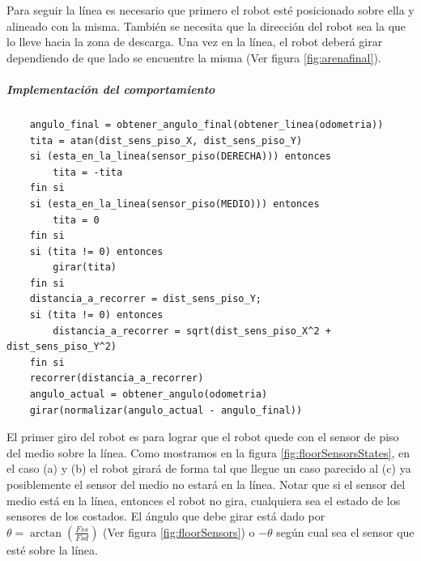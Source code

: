 Para seguir la l\'inea es necesario que primero el robot est\'e posicionado
sobre ella y alineado con la misma. Tambi\'en se necesita que la direcci\'on
del robot sea la que lo lleve hacia la zona de descarga. Una vez en
la l\'inea, el robot deber\'a girar dependiendo de que lado se encuentre la
misma (Ver figura \ref{fig:arenafinal}).

\subparagraph{Implementaci\'on del comportamiento}
\begin{verbatim}
    angulo_final = obtener_angulo_final(obtener_linea(odometria))
    tita = atan(dist_sens_piso_X, dist_sens_piso_Y)
    si (esta_en_la_linea(sensor_piso(DERECHA))) entonces
        tita = -tita
    fin si
    si (esta_en_la_linea(sensor_piso(MEDIO))) entonces
        tita = 0
    fin si
    si (tita != 0) entonces
        girar(tita)
    fin si
    distancia_a_recorrer = dist_sens_piso_Y;
    si (tita != 0) entonces
        distancia_a_recorrer = sqrt(dist_sens_piso_X^2 + dist_sens_piso_Y^2)
    fin si
    recorrer(distancia_a_recorrer)
    angulo_actual = obtener_angulo(odometria)
    girar(normalizar(angulo_actual - angulo_final))
\end{verbatim}

El primer giro del robot es para lograr que el robot quede con el sensor de
piso del medio sobre la l\'inea. Como mostramos en la figura
\ref{fig:floorSensorsStates}, en el caso (a) y (b) el robot girar\'a de forma
tal que llegue un caso parecido al (c) ya posiblemente el sensor del medio no
estar\'a en la l\'inea. Notar que si el sensor del medio est\'a en la l\'inea,
entonces el robot no gira, cualquiera sea el estado de los sensores de los
costados. El \'angulo que debe girar est\'a dado por $\theta = \arctan
(\frac{Fss}{Fsd})$ (Ver figura \ref{fig:floorSensors}) o $-\theta$ seg\'un
cual sea el sensor que est\'e sobre la l\'inea.


